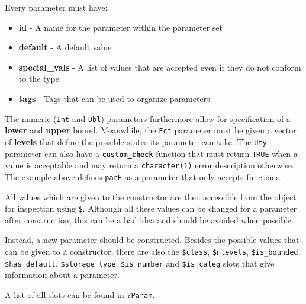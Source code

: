 \documentclass[]{article}
\newenvironment{Shaded}{}{}
\newcommand{\NormalTok}[1]{#1}
\newcommand{\OperatorTok}[1]{#1}
\providecommand{\tightlist}{%
  \setlength{\itemsep}{0pt}\setlength{\parskip}{0pt}}
\renewenvironment{Shaded} {\begin{snugshade}\small} {\end{snugshade}}
\begin{document}
Every parameter must have:

\begin{itemize}
\tightlist
\item
  \textbf{id} - A name for the parameter within the parameter set
\item
  \textbf{default} - A default value
\item
  \textbf{special\_vals} - A list of values that are accepted even if they do not conform to the type
\item
  \textbf{tags} - Tags that can be used to organize parameters
\end{itemize}

The numeric (\texttt{Int} and \texttt{Dbl}) parameters furthermore allow for specification of a \textbf{lower} and \textbf{upper} bound.
Meanwhile, the \texttt{Fct} parameter must be given a vector of \textbf{levels} that define the possible states its parameter can take.
The \texttt{Uty} parameter can also have a \textbf{\texttt{custom\_check}} function that must return \texttt{TRUE} when a value is acceptable and may return a \texttt{character(1)} error description otherwise.
The example above defines \texttt{parE} as a parameter that only accepts functions.

All values which are given to the constructor are then accessible from the object for inspection using \texttt{\$}.
Although all these values can be changed for a parameter after construction, this can be a bad idea and should be avoided when possible.

Instead, a new parameter should be constructed.
Besides the possible values that can be given to a constructor, there are also the \texttt{\$class}, \texttt{\$nlevels}, \texttt{\$is\_bounded}, \texttt{\$has\_default}, \texttt{\$storage\_type}, \texttt{\$is\_number} and \texttt{\$is\_categ} slots that give information about a parameter.

A list of all slots can be found in \href{https://paradox.mlr-org.com/reference/Param.html}{\texttt{?Param}}.

\begin{Shaded}
\end{Shaded}
\end{document}
